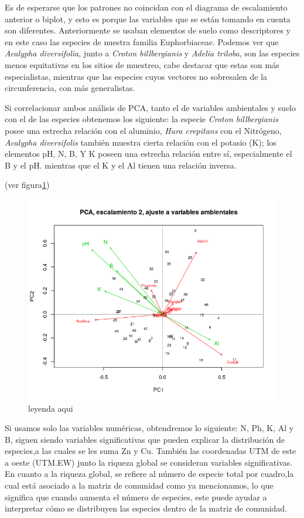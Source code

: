 \documentclass[11pt,]{article}
\begin{document}
Es de esperarse que los patrones no coincidan con el diagrama de
escalamiento anterior o biplot, y esto es porque las variables que se
están tomando en cuenta son diferentes. Anteriormente se usaban
elementos de suelo como descriptores y en este caso las especies de
nuestra familia Euphorbiaceae. Podemos ver que \emph{Acalypha
diversifolia}, junto a \emph{Croton billbergianis} y \emph{Adelia
triloba}, son las especies menos equitativas en los sitios de muestreo,
cabe destacar que estas son más especialistas, mientras que las especies
cuyos vectores no sobresalen de la circunferencia, con más generalistas.

Si correlacionar ambos análisis de PCA, tanto el de variables
ambientales y suelo con el de las especies obtenemos los siguiente: la
especie \emph{Croton billbergianis} posee una estrecha relación con el
aluminio, \emph{Hura crepitans} con el Nitrógeno, \emph{Acalypha
diversifolis} también muestra cierta relación con el potasio (K); los
elementos pH, N, B, Y K poseen una estrecha relación entre sí,
especialmente el B y el pH. mientras que el K y el Al tienen una
relación inversa.

(ver figura\ref{fig:suelo_especie})

\begin{figure}
\centering
\includegraphics{suelo_especie.png}
\caption{\label{fig:suelo_especie}leyenda aqui}
\end{figure}

Si usamos solo las variables numéricas, obtendremos lo siguiente: N, Ph,
K, Al y B, siguen siendo variables significativas que pueden explicar la
distribución de especies,a las cuales se les suma Zn y Cu. También las
coordenadas UTM de este a oeste (UTM.EW) junto la riqueza global se
consideran variables significativas. En cuanto a la riqueza global, se
refiere al número de especie total por cuadro,la cual está asociado a la
matriz de comunidad como ya mencionamos, lo que significa que cuando
aumenta el número de especies, este puede ayudar a interpretar cómo se
distribuyen las especies dentro de la matriz de comunidad.
\end{document}
